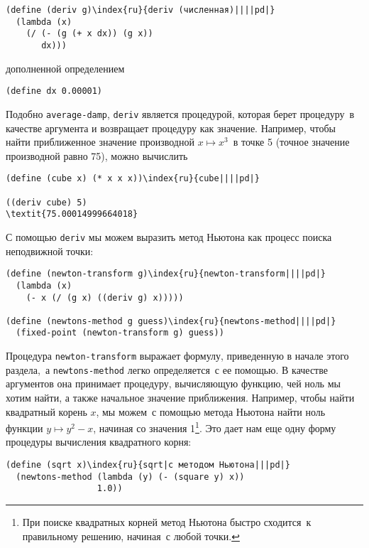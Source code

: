 \begin{Verbatim}[fontsize=\small]
(define (deriv g)\index{ru}{deriv (численная)||||pd|}
  (lambda (x)
    (/ (- (g (+ x dx)) (g x))
       dx)))
\end{Verbatim}
дополненной определением

\begin{Verbatim}[fontsize=\small]
(define dx 0.00001)
\end{Verbatim}

Подобно {\tt average-damp}, {\tt deriv}
является процедурой, которая берет процедуру~в качестве аргумента и
возвращает процедуру как значение.  Например, чтобы найти приближенное 
значение производной $x \mapsto x^3$~в точке 5 (точное
значение производной равно 75), можно вычислить 

\begin{Verbatim}[fontsize=\small]
(define (cube x) (* x x x))\index{ru}{cube||||pd|}

((deriv cube) 5)
\textit{75.00014999664018}
\end{Verbatim}

С помощью {\tt deriv} мы можем выразить метод
Ньютона как процесс поиска неподвижной точки:

\begin{Verbatim}[fontsize=\small]
(define (newton-transform g)\index{ru}{newton-transform||||pd|}
  (lambda (x)
    (- x (/ (g x) ((deriv g) x)))))

(define (newtons-method g guess)\index{ru}{newtons-method||||pd|}
  (fixed-point (newton-transform g) guess))
\end{Verbatim}
Процедура {\tt newton-transform} выражает формулу, приведенную
в начале этого раздела,~а {\tt newtons-method} легко
определяется~с ее помощью. В качестве аргументов она принимает
процедуру, вычисляющую функцию, чей ноль мы хотим найти, а
также начальное значение приближения. 
Например, чтобы найти
квадратный корень $x$, мы можем~с помощью метода Ньютона
найти ноль функции $y \mapsto y^2 - x$, начиная со значения 
1\footnote{ При поиске квадратных корней метод
Ньютона быстро сходится~к правильному решению, начиная~с любой точки.}.
Это дает нам еще одну форму процедуры вычисления квадратного корня:

\begin{Verbatim}[fontsize=\small]
(define (sqrt x)\index{ru}{sqrt|с методом Ньютона|||pd|}
  (newtons-method (lambda (y) (- (square y) x))
                  1.0))
\end{Verbatim}

